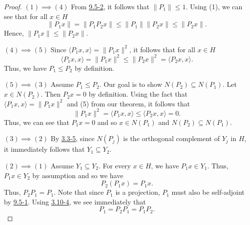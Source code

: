 \begin{proof}
\( (1) \implies (4) \) From {\hyperref[9.5-2]{9.5-2}}, it follows that \( \|{P}_{1}\| \leq 1  \). Using (1), we can see that for all \( x \in H \)
\[  \|{P}_{1}x\| = \|{P}_{1} {P}_{2} x \| \leq \|{P}_{1}\| \|{P}_{2}x\| \leq \|{P}_{2}x\|.  \]
Hence, \( \|{P}_{1}x \| \leq \|{P}_{2}x \| \).

\( (4) \implies (5) \) Since \( \langle {P}_{1}x ,  x  \rangle = \|P_1 x\|^{2} \), it follows that for all \( x \in H  \)
\[  \langle {P}_{1}x  , x \rangle = \|{P}_{1}x \|^{2} \leq \|{P}_{2}x\|^{2} = \langle {P}_{2}x  ,  x  \rangle. \]
Thus, we have \( {P}_{1} \leq {P}_{2} \) by definition.

\( (5) \implies (3) \) Assume \( {P}_{1}\leq {P}_{2} \). Our goal is to show \( N({P}_{2}) \subseteq N({P}_{1})  \). Let \( x \in N({P}_{2}) \). Then \( {P}_{2}x = 0  \) by definition. Using the fact that \( \langle {P}_{1}x  ,  x  \rangle = \|{P}_{1}x\|^{2} \) and (5) from our theorem, it follows that 
\[  \|{P}_{1}x\|^{2} = \langle {P}_{1}x  ,  x  \rangle \leq \langle {P}_{2}x  ,  x  \rangle = 0.   \]
Thus, we can see that \( {P}_{1}x = 0  \) and so \( x \in N({P}_{1}) \) and \( N({P}_{2}) \subseteq N({P}_{1})  \).

  \( (3) \implies (2) \) By {\hyperref[3.3-5]{3.3-5}}, since \( N({P}_{j})   \) is the orthogonal complement of \( {Y}_{j} \) in \( H  \), it immediately follows that \( {Y}_{1} \subseteq {Y}_{2} \). 

  \( (2) \implies (1) \) Assume \( {Y}_{1} \subseteq {Y}_{2} \). For every \( x \in H  \), we have \( {P}_{1}x \in {Y}_{1} \). Thus, \( {P}_{1}x \in {Y}_{2} \) by assumption and so we have 
  \[  {P}_{2}({P}_{1}x) = {P}_{1}x.   \]
  Thus, \( {P}_{2}{P}_{1} = {P}_{1} \). Note that since \( {P}_{1} \) is a projection, \( {P}_{1} \) must also be self-adjoint by {\hyperref[9.5-1]{9.5-1}}. Using {\hyperref[3.10-4]{3.10-4}}, we see immediately that   
  \[  {P}_{1} = {P}_{2}{P}_{1} = {P}_{1} {P}_{2}. \]
\end{proof}


